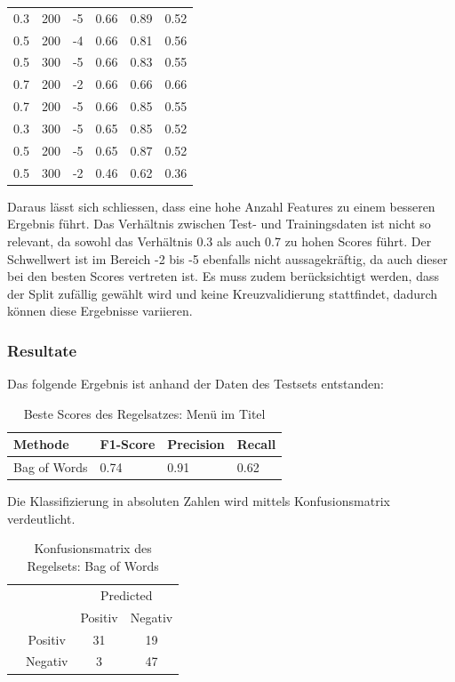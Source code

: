 \begin{table}
\begin{tabular}{ | l | l | l | l | l | l | }
		0.3 & 200 & -5 & 0.66 & 0.89 & 0.52 \\ 
		0.5 & 200 & -4 & 0.66 & 0.81 & 0.56 \\
		0.5 & 300 & -5 & 0.66 & 0.83 & 0.55 \\ 
		0.7 & 200 & -2 & 0.66 & 0.66 & 0.66 \\ 
		0.7 & 200 & -5 & 0.66 & 0.85 & 0.55 \\ 
		0.3 & 300 & -5 & 0.65 & 0.85 & 0.52 \\ 
		0.5 & 200 & -5 & 0.65 & 0.87 & 0.52 \\
		0.5 & 300 & -2 & 0.46 & 0.62 & 0.36 \\ \hline
	\end{tabular}
\end{table}
Daraus lässt sich schliessen, dass eine hohe Anzahl Features zu einem besseren Ergebnis führt.
Das Verhältnis zwischen Test- und Trainingsdaten ist nicht so relevant, da sowohl das Verhältnis 0.3 als auch 0.7 zu hohen Scores führt.
Der Schwellwert ist im Bereich -2 bis -5 ebenfalls nicht aussagekräftig, da auch dieser bei den besten Scores vertreten ist.
Es muss zudem berücksichtigt werden, dass der Split zufällig gewählt wird und keine Kreuzvalidierung stattfindet, dadurch können diese Ergebnisse variieren.
\FloatBarrier
\subsubsection{Resultate}
Das folgende Ergebnis ist anhand der Daten des Testsets entstanden:\\
\begin{table}[H]
	\caption{Beste Scores des Regelsatzes: Menü im Titel}
	\centering
	\begin{tabular}{|l|l|l|l|}
		\hline
		Methode & F1-Score & Precision & Recall\\
		\hline
		Bag of Words & 0.74 & 0.91 & 0.62\\
		\hline
	\end{tabular}
\end{table}
Die Klassifizierung in absoluten Zahlen wird mittels Konfusionsmatrix verdeutlicht.
\begin{table}[H]
	\caption{Konfusionsmatrix des Regelsets: Bag of Words}
	\centering
	\begin{tabular}{@{}cc|cc@{}}
		\multicolumn{1}{c}{} &\multicolumn{1}{c}{} &\multicolumn{2}{c}{Predicted} \\ 
		\multicolumn{1}{c}{} & 
		\multicolumn{1}{c|}{} & 
		\multicolumn{1}{c}{Positiv} & 
		\multicolumn{1}{c}{Negativ} \\ 
		\cline{2-4}
		\multirow[c]{2}{*}{\rotatebox[origin=tr]{90}{Actual}}
		& Positiv  & 31   & 19   \\[1.5ex]
		& Negativ  & 3   & 47 \\ 
		\cline{2-4}
	\end{tabular}
\end{table}
